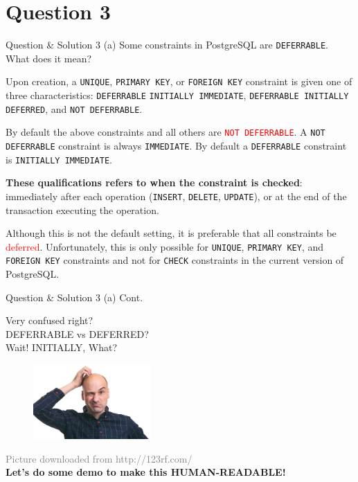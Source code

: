 \section*{Question 3}

\begin{frame}[fragile]{Question \& Solution 3 (a)}
Some constraints in PostgreSQL are \texttt{DEFERRABLE}. What does it mean? \vspace{10pt}

Upon creation, a \texttt{UNIQUE}, \texttt{PRIMARY KEY}, or \texttt{FOREIGN KEY} constraint is given one of three characteristics: \texttt{DEFERRABLE} \texttt{INITIALLY IMMEDIATE}, \texttt{DEFERRABLE INITIALLY DEFERRED}, and \texttt{NOT DEFERRABLE}.  \vspace{10pt}

By default the above constraints and all others are \textcolor{red}{\texttt{NOT DEFERRABLE}}. A \texttt{NOT DEFERRABLE} constraint is always \texttt{IMMEDIATE}. By default a \texttt{DEFERRABLE} constraint is \texttt{INITIALLY IMMEDIATE}. \vspace{10pt}

\textbf{These qualifications refers to when the constraint is checked}: immediately after each operation (\texttt{INSERT}, \texttt{DELETE}, \texttt{UPDATE}), or at the end of the transaction executing the operation. \vspace{10pt}

Although this is not the default setting, it is preferable that all constraints be \textcolor{red}{deferred}. Unfortunately, this is only possible for \texttt{UNIQUE}, \texttt{PRIMARY KEY}, and \texttt{FOREIGN KEY} constraints and not for \texttt{CHECK} constraints in the current version of PostgreSQL.
\end{frame}

\begin{frame}[fragile]{Question \& Solution 3 (a) Cont.}
\begin{center}
Very confused right? \\
DEFERRABLE vs DEFERRED?\\ 
Wait! INITIALLY, What? 
\end{center}

\begin{figure}
	\includegraphics[width=0.4\textwidth]{t1/images/question.jpg}
\end{figure}

\begin{center}
{\tiny \textcolor{gray}{Picture downloaded from http://123rf.com/}}\vspace{10pt}\\
\textbf{Let's do some demo to make this HUMAN-READABLE!}
\end{center}
\end{frame}

